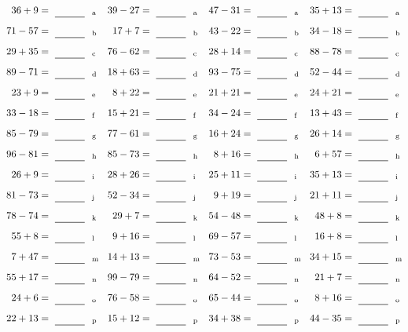 \documentclass
[
  draft    = true,
  fontsize = 11pt,
  parskip  = half-
]
{scrartcl}
\begin{document}
\clearpage
\begin{align*}
    \pline{36+9}&=\rline{a}
  & \pline{39-27}&=\rline{a}
  & \pline{47-31}&=\rline{a}
  & \pline{35+13}&=\rline{a} \\[1ex]
    \pline{71-57}&=\rline{b}
  & \pline{17+7}&=\rline{b}
  & \pline{43-22}&=\rline{b}
  & \pline{34-18}&=\rline{b} \\[1ex]
    \pline{29+35}&=\rline{c}
  & \pline{76-62}&=\rline{c}
  & \pline{28+14}&=\rline{c}
  & \pline{88-78}&=\rline{c} \\[1ex]
    \pline{89-71}&=\rline{d}
  & \pline{18+63}&=\rline{d}
  & \pline{93-75}&=\rline{d}
  & \pline{52-44}&=\rline{d} \\[1ex]
    \pline{23+9}&=\rline{e}
  & \pline{8+22}&=\rline{e}
  & \pline{21+21}&=\rline{e}
  & \pline{24+21}&=\rline{e} \\[1ex]
    \pline{33-18}&=\rline{f}
  & \pline{15+21}&=\rline{f}
  & \pline{34-24}&=\rline{f}
  & \pline{13+43}&=\rline{f} \\[1ex]
    \pline{85-79}&=\rline{g}
  & \pline{77-61}&=\rline{g}
  & \pline{16+24}&=\rline{g}
  & \pline{26+14}&=\rline{g} \\[1ex]
    \pline{96-81}&=\rline{h}
  & \pline{85-73}&=\rline{h}
  & \pline{8+16}&=\rline{h}
  & \pline{6+57}&=\rline{h} \\[1ex]
    \pline{26+9}&=\rline{i}
  & \pline{28+26}&=\rline{i}
  & \pline{25+11}&=\rline{i}
  & \pline{35+13}&=\rline{i} \\[1ex]
    \pline{81-73}&=\rline{j}
  & \pline{52-34}&=\rline{j}
  & \pline{9+19}&=\rline{j}
  & \pline{21+11}&=\rline{j} \\[1ex]
    \pline{78-74}&=\rline{k}
  & \pline{29+7}&=\rline{k}
  & \pline{54-48}&=\rline{k}
  & \pline{48+8}&=\rline{k} \\[1ex]
    \pline{55+8}&=\rline{l}
  & \pline{9+16}&=\rline{l}
  & \pline{69-57}&=\rline{l}
  & \pline{16+8}&=\rline{l} \\[1ex]
    \pline{7+47}&=\rline{m}
  & \pline{14+13}&=\rline{m}
  & \pline{73-53}&=\rline{m}
  & \pline{34+15}&=\rline{m} \\[1ex]
    \pline{55+17}&=\rline{n}
  & \pline{99-79}&=\rline{n}
  & \pline{64-52}&=\rline{n}
  & \pline{21+7}&=\rline{n} \\[1ex]
    \pline{24+6}&=\rline{o}
  & \pline{76-58}&=\rline{o}
  & \pline{65-44}&=\rline{o}
  & \pline{8+16}&=\rline{o} \\[1ex]
    \pline{22+13}&=\rline{p}
  & \pline{15+12}&=\rline{p}
  & \pline{34+38}&=\rline{p}
  & \pline{44-35}&=\rline{p}
\end{align*}
\end{document}
